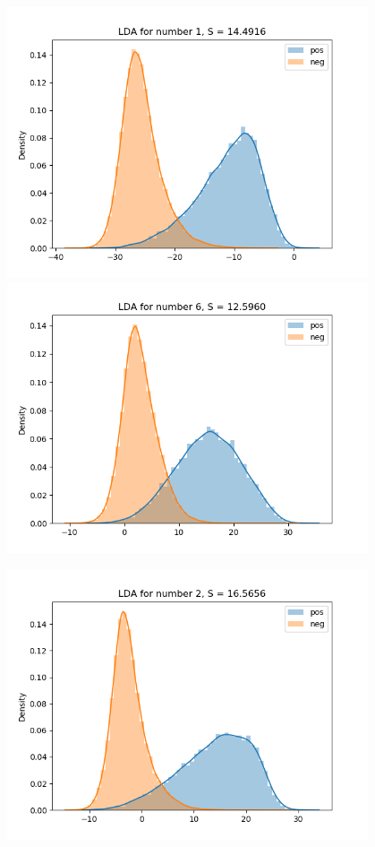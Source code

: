 \documentclass{article}
\begin{document}
\begin{figure}[H]
\begin{minipage}{0.19\textwidth}
        \includegraphics[width=0.95\textwidth]{fig/lda/1.png}
        \includegraphics[width=0.95\textwidth]{fig/lda/6.png}
    \end{minipage}
    \begin{minipage}{0.19\textwidth}
        \centering
        \includegraphics[width=0.95\textwidth]{fig/lda/2.png}

\end{minipage}
\end{figure}
\end{document}
